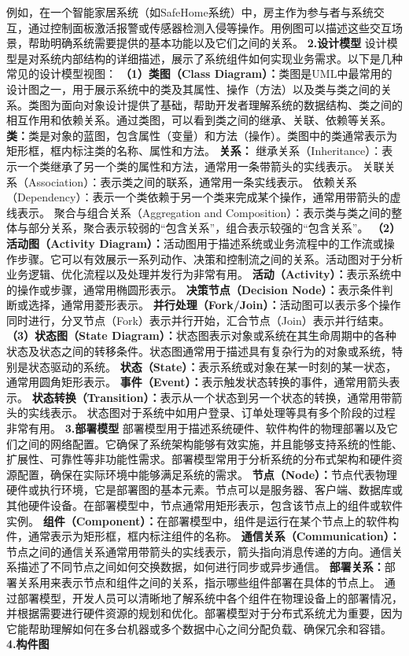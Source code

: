 例如，在一个智能家居系统（如SafeHome系统）中，房主作为参与者与系统交互，通过控制面板激活报警或传感器检测入侵等操作。用例图可以描述这些交互场景，帮助明确系统需要提供的基本功能以及它们之间的关系。 \textbf{2.设计模型} 设计模型是对系统内部结构的详细描述，展示了系统组件如何实现业务需求。以下是几种常见的设计模型视图： \textbf{（1）类图（Class Diagram）：}类图是UML中最常用的设计图之一，用于展示系统中的类及其属性、操作（方法）以及类与类之间的关系。类图为面向对象设计提供了基础，帮助开发者理解系统的数据结构、类之间的相互作用和依赖关系。通过类图，可以看到类之间的继承、关联、依赖等关系。 \textbf{类：}类是对象的蓝图，包含属性（变量）和方法（操作）。类图中的类通常表示为矩形框，框内标注类的名称、属性和方法。 \textbf{关系：} 继承关系（Inheritance）：表示一个类继承了另一个类的属性和方法，通常用一条带箭头的实线表示。 关联关系（Association）：表示类之间的联系，通常用一条实线表示。 依赖关系（Dependency）：表示一个类依赖于另一个类来完成某个操作，通常用带箭头的虚线表示。 聚合与组合关系（Aggregation and Composition）：表示类与类之间的整体与部分关系，聚合表示较弱的``包含关系''，组合表示较强的``包含关系''。 \textbf{（2）活动图（Activity Diagram）：}活动图用于描述系统或业务流程中的工作流或操作步骤。它可以有效展示一系列动作、决策和控制流之间的关系。活动图对于分析业务逻辑、优化流程以及处理并发行为非常有用。 \textbf{活动（Activity）：}表示系统中的操作或步骤，通常用椭圆形表示。 \textbf{决策节点（Decision Node）：}表示条件判断或选择，通常用菱形表示。 \textbf{并行处理（Fork/Join）：}活动图可以表示多个操作同时进行，分叉节点（Fork）表示并行开始，汇合节点（Join）表示并行结束。 \textbf{（3）状态图（State Diagram）：}状态图表示对象或系统在其生命周期中的各种状态及状态之间的转移条件。状态图通常用于描述具有复杂行为的对象或系统，特别是状态驱动的系统。 \textbf{状态（State）：}表示系统或对象在某一时刻的某一状态，通常用圆角矩形表示。 \textbf{事件（Event）：}表示触发状态转换的事件，通常用箭头表示。 \textbf{状态转换（Transition）：}表示从一个状态到另一个状态的转换，通常用带箭头的实线表示。 状态图对于系统中如用户登录、订单处理等具有多个阶段的过程非常有用。 \textbf{3.部署模型} 部署模型用于描述系统硬件、软件构件的物理部署以及它们之间的网络配置。它确保了系统架构能够有效实施，并且能够支持系统的性能、扩展性、可靠性等非功能性需求。部署模型常用于分析系统的分布式架构和硬件资源配置，确保在实际环境中能够满足系统的需求。 \textbf{节点（Node）：}节点代表物理硬件或执行环境，它是部署图的基本元素。节点可以是服务器、客户端、数据库或其他硬件设备。在部署模型中，节点通常用矩形表示，包含该节点上的组件或软件实例。 \textbf{组件（Component）：}在部署模型中，组件是运行在某个节点上的软件构件，通常表示为矩形框，框内标注组件的名称。 \textbf{通信关系（Communication）：}节点之间的通信关系通常用带箭头的实线表示，箭头指向消息传递的方向。通信关系描述了不同节点之间如何交换数据，如何进行同步或异步通信。 \textbf{部署关系：}部署关系用来表示节点和组件之间的关系，指示哪些组件部署在具体的节点上。 通过部署模型，开发人员可以清晰地了解系统中各个组件在物理设备上的部署情况，并根据需要进行硬件资源的规划和优化。部署模型对于分布式系统尤为重要，因为它能帮助理解如何在多台机器或多个数据中心之间分配负载、确保冗余和容错。 \textbf{4.构件图} 
